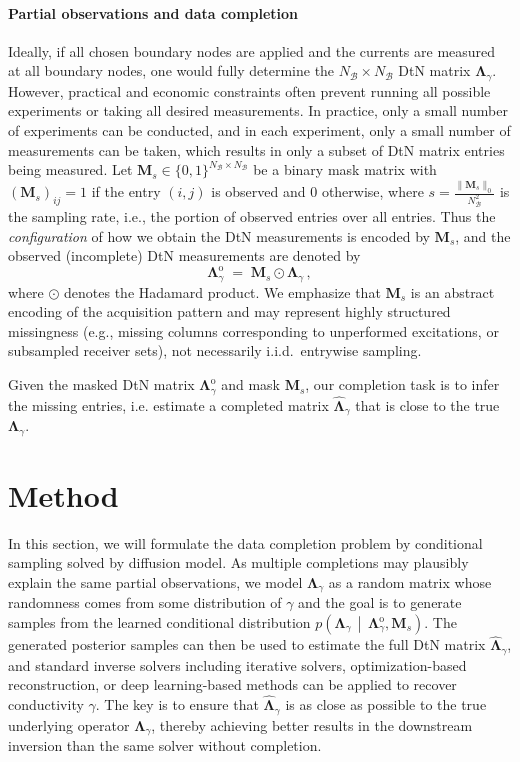 \documentclass{article}
\begin{document}
\paragraph{Partial observations and data completion}
 Ideally, if all chosen boundary nodes are applied and the currents are measured at all boundary nodes, one would fully determine the $N_{\mathcal{B}} \times N_{\mathcal{B}}$ DtN matrix $\mathbf{\Lambda}_{\gamma}$. However, practical and economic constraints often prevent running all possible experiments or taking all desired measurements. In practice, only a small number of experiments can be
conducted, and in each experiment, only a small number of measurements can be
taken, which results in only a subset of DtN matrix entries being measured. Let $\mathbf{M}_s\in\{0,1\}^{N_{\mathcal B}\times N_{\mathcal B}}$ be a binary mask matrix with $(\mathbf{M}_s)_{ij}=1$ if the entry $(i,j)$ is observed and $0$ otherwise, where $s=\frac{\| \mathbf{M}_s\|_0} {N^2_\mathcal{B}}$ is the sampling rate, i.e., the portion of observed entries over all entries. Thus the \emph{configuration} of how we obtain the DtN measurements is encoded by $\mathbf{M}_s$, and the observed (incomplete) DtN measurements are denoted by
\[
\mathbf{\Lambda}^{\text{o}}_\gamma \;=\; \mathbf{M}_s \odot \mathbf{\Lambda}_\gamma\,,
\]
where $\odot$ denotes the Hadamard product. We emphasize that \(\mathbf M_s\) is an abstract encoding of the acquisition pattern and may represent highly structured missingness (e.g., missing columns corresponding to unperformed excitations, or subsampled receiver sets), not necessarily i.i.d.\ entrywise sampling.


Given the masked DtN matrix $\mathbf{\Lambda}^{\mathrm{o}}_\gamma$ and mask $ \mathbf{M}_s$, our completion task is to infer the missing entries, i.e. estimate a completed matrix $\widehat{\mathbf{\Lambda}}_\gamma$ that is close to the true $\mathbf{\Lambda}_\gamma$. 



\section{Method}\label{sec:method}

In this section, we will formulate the data completion problem by conditional sampling solved by diffusion model. As multiple completions may plausibly explain the same partial observations, we model $\mathbf{\Lambda}_\gamma$ as a random matrix whose randomness comes from some distribution of $\gamma$ and the goal is to generate samples from the learned conditional distribution $p\!\left(\mathbf{\Lambda}_{\gamma}\,\middle|\,\mathbf{\Lambda}^{\mathrm{o}}_{\gamma}, \mathbf{M}_s\right)$. 
The generated posterior samples can then be used to estimate the full DtN matrix $\hat{\mathbf{\Lambda}}_\gamma$, and standard inverse solvers including iterative solvers, optimization-based reconstruction, or deep learning-based methods can be applied to recover conductivity $\gamma$.
The key is to ensure that $\hat{\mathbf{\Lambda}}_\gamma$ is as close as possible to the true underlying operator $\mathbf{\Lambda}_\gamma$, thereby achieving better results in the downstream inversion than the same solver without completion.
\end{document}

